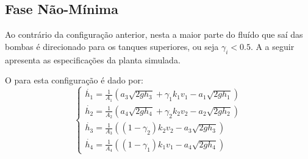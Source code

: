 \subsection{Fase Não-Mínima}
Ao contrário da configuração anterior, nesta a maior parte do fluído que saí das bombas é direcionado  para os tanques superiores, ou seja $\gamma_i < 0.5$. A  a seguir apresenta as especificações da planta simulada.

\begin{table}[!ht]
	\caption{Parâmetros da planta em fase não-mínima}
	\small
	\centering
	\label{tabFaseNaoMinima}
\end{table}

O  para esta configuração é dado por:
\begin{equation}
\begin{cases}
\dot{h_{1}} = \frac{1}{A_{1}}(a_{3}\sqrt{2gh_{3}} + \gamma_{1}k_{1}v_{1} - a_{1}\sqrt{2gh_{1}})\\

\dot{h_{2}} = \frac{1}{A_{2}}(a_{4}\sqrt{2gh_{4}} + \gamma_{2}k_{2}v_{2} - a_{2}\sqrt{2gh_{2}})\\

\dot{h_{3}} = \frac{1}{A_{3}}((1 - \gamma_{2})k_{2}v_{2} - a_{3}\sqrt{2gh_{3}})\\

\dot{h_{4}} = \frac{1}{A_{4}}((1 - \gamma_{1})k_{1}v_{1} - a_{4}\sqrt{2gh_{4}})
\end{cases}
\label{eqFNMNL}
\end{equation}


